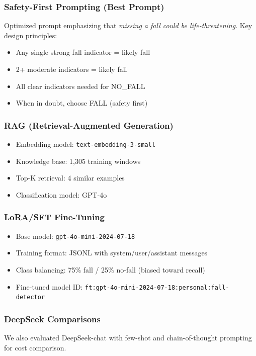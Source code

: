 \documentclass[conference]{IEEEtran}
\begin{document}
\subsubsection{Safety-First Prompting (Best Prompt)}
Optimized prompt emphasizing that \textit{missing a fall could be life-threatening}. Key design principles:
\begin{itemize}[leftmargin=*]
    \item Any single strong fall indicator = likely fall
    \item 2+ moderate indicators = likely fall
    \item All clear indicators needed for NO\_FALL
    \item When in doubt, choose FALL (safety first)
\end{itemize}

\subsubsection{RAG (Retrieval-Augmented Generation)}
\begin{itemize}[leftmargin=*]
    \item Embedding model: \texttt{text-embedding-3-small}
    \item Knowledge base: 1,305 training windows
    \item Top-K retrieval: 4 similar examples
    \item Classification model: GPT-4o
\end{itemize}

\subsubsection{LoRA/SFT Fine-Tuning}
\begin{itemize}[leftmargin=*]
    \item Base model: \texttt{gpt-4o-mini-2024-07-18}
    \item Training format: JSONL with system/user/assistant messages
    \item Class balancing: 75\% fall / 25\% no-fall (biased toward recall)
    \item Fine-tuned model ID: \texttt{ft:gpt-4o-mini-2024-07-18:personal:fall-detector}
\end{itemize}

\subsubsection{DeepSeek Comparisons}
We also evaluated DeepSeek-chat with few-shot and chain-of-thought prompting for cost comparison.
\end{document}
